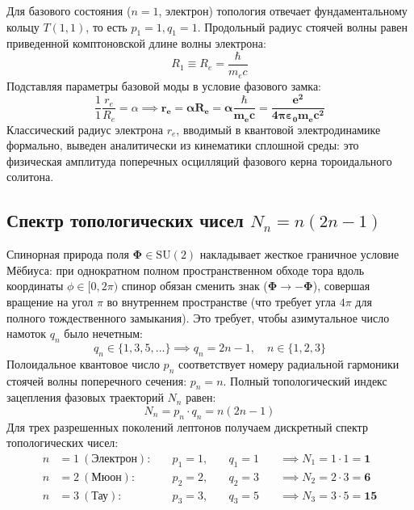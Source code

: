 \documentclass[12pt,a4paper]{article}
\begin{document}
	Для базового состояния ($n=1$, электрон) топология отвечает фундаментальному кольцу $T(1,1)$, то есть $p_1 = 1, q_1 = 1$. Продольный радиус стоячей волны равен приведенной комптоновской длине волны электрона:
	\begin{equation}
		R_1 \equiv R_e = \frac{\hbar}{m_e c}
	\end{equation}
	Подставляя параметры базовой моды в условие фазового замка:
	\begin{equation}
		\frac{1}{1} \frac{r_e}{R_e} = \alpha \implies \mathbf{r_e = \alpha R_e = \alpha \frac{\hbar}{m_e c} = \frac{e^2}{4\pi\varepsilon_0 m_e c^2}}
	\end{equation}
	Классический радиус электрона $r_e$, вводимый в квантовой электродинамике формально, выведен аналитически из кинематики сплошной среды: это физическая амплитуда поперечных осцилляций фазового керна тороидального солитона.
	
	\subsection{Спектр топологических чисел $N_n = n(2n-1)$}
	Спинорная природа поля $\boldsymbol{\Phi} \in \mathrm{SU}(2)$ накладывает жесткое граничное условие Мёбиуса: при однократном полном пространственном обходе тора вдоль координаты $\phi \in [0, 2\pi)$ спинор обязан сменить знак ($\boldsymbol{\Phi} \to -\boldsymbol{\Phi}$), совершая вращение на угол $\pi$ во внутреннем пространстве (что требует угла $4\pi$ для полного тождественного замыкания). 
	Это требует, чтобы азимутальное число намоток $q_n$ было нечетным:
	\begin{equation}
		q_n \in \{1, 3, 5, \dots\} \implies q_n = 2n - 1, \quad n \in \{1, 2, 3\}
	\end{equation}
	Полоидальное квантовое число $p_n$ соответствует номеру радиальной гармоники стоячей волны поперечного сечения: $p_n = n$.
	Полный топологический индекс зацепления фазовых траекторий $N_n$ равен:
	\begin{equation}
		N_n = p_n \cdot q_n = n(2n - 1)
	\end{equation}
	Для трех разрешенных поколений лептонов получаем дискретный спектр топологических чисел:
	\begin{align}
		n &= 1 \ (\text{Электрон}): \quad &p_1 = 1, \quad &q_1 = 1 \quad &\implies N_1 = 1 \cdot 1 = \mathbf{1} \\
		n &= 2 \ (\text{Мюон}):     \quad &p_2 = 2, \quad &q_2 = 3 \quad &\implies N_2 = 2 \cdot 3 = \mathbf{6} \\
		n &= 3 \ (\text{Тау}):      \quad &p_3 = 3, \quad &q_3 = 5 \quad &\implies N_3 = 3 \cdot 5 = \mathbf{15}
	\end{align}
	
\end{document}
